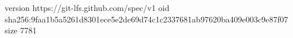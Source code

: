 version https://git-lfs.github.com/spec/v1
oid sha256:9faa1b5a5261d8301ece5e2de69d74c1c2337681ab97620ba409e003c9e87f07
size 7781

